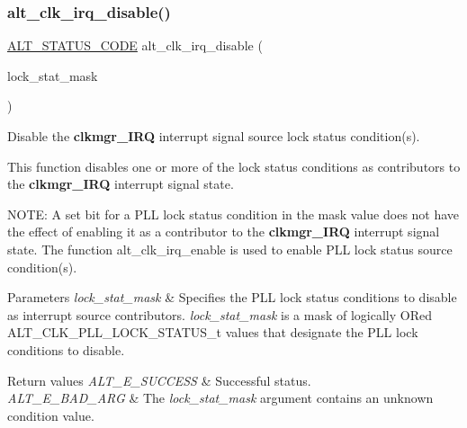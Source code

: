 \subsubsection{\texorpdfstring{alt\_clk\_irq\_disable()}{alt\_clk\_irq\_disable()}}
{\footnotesize\ttfamily \mbox{\hyperlink{hwlib_8h_abdb0d369f069723ca55d6c94bcaaaa12}{A\+L\+T\+\_\+\+S\+T\+A\+T\+U\+S\+\_\+\+C\+O\+DE}} alt\+\_\+clk\+\_\+irq\+\_\+disable (\begin{DoxyParamCaption}\item[{\mbox{\hyperlink{group__CLK__MGR__STATUS_ga62fbfc277685cad341f57ee0a252092c}{A\+L\+T\+\_\+\+C\+L\+K\+\_\+\+P\+L\+L\+\_\+\+L\+O\+C\+K\+\_\+\+S\+T\+A\+T\+U\+S\+\_\+t}}}]{lock\+\_\+stat\+\_\+mask }\end{DoxyParamCaption})}

Disable the {\bfseries{clkmgr\+\_\+\+I\+RQ}} interrupt signal source lock status condition(s).

This function disables one or more of the lock status conditions as contributors to the {\bfseries{clkmgr\+\_\+\+I\+RQ}} interrupt signal state.

N\+O\+TE\+: A set bit for a P\+LL lock status condition in the mask value does not have the effect of enabling it as a contributor to the {\bfseries{clkmgr\+\_\+\+I\+RQ}} interrupt signal state. The function alt\+\_\+clk\+\_\+irq\+\_\+enable is used to enable P\+LL lock status source condition(s).


\begin{DoxyParams}{Parameters}
{\em lock\+\_\+stat\+\_\+mask} & Specifies the P\+LL lock status conditions to disable as interrupt source contributors. {\itshape lock\+\_\+stat\+\_\+mask} is a mask of logically OR\textquotesingle{}ed A\+L\+T\+\_\+\+C\+L\+K\+\_\+\+P\+L\+L\+\_\+\+L\+O\+C\+K\+\_\+\+S\+T\+A\+T\+U\+S\+\_\+t values that designate the P\+LL lock conditions to disable.\\
\hline
\end{DoxyParams}

\begin{DoxyRetVals}{Return values}
{\em A\+L\+T\+\_\+\+E\+\_\+\+S\+U\+C\+C\+E\+SS} & Successful status. \\
\hline
{\em A\+L\+T\+\_\+\+E\+\_\+\+B\+A\+D\+\_\+\+A\+RG} & The {\itshape lock\+\_\+stat\+\_\+mask} argument contains an unknown condition value. \\
\hline
\end{DoxyRetVals}
\mbox{\label{group__CLK__MGR__INT_ga8dac52ec4e5a203a697ce86a8a893fdd}} 
